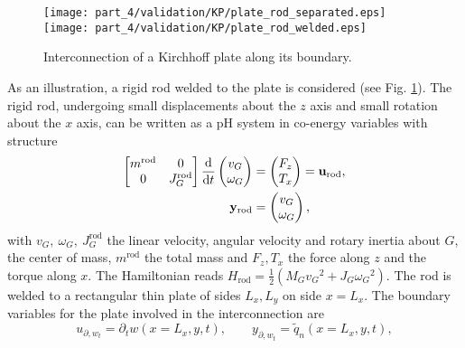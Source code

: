\begin{figure}[tb]
	\centering
	\texttt{[image: part\_4/validation/KP/plate\_rod\_separated.eps]} 
	\texttt{[image: part\_4/validation/KP/plate\_rod\_welded.eps]} 
	\caption{Interconnection of a Kirchhoff plate along its boundary.}
	\label{fig:sketchRodPlate}
\end{figure}

As an illustration, a rigid rod welded to the plate is considered  (see Fig. \ref{fig:sketchRodPlate}). The rigid rod, undergoing small displacements about the $z$ axis and small rotation about the $x$ axis, can be written as a pH system in co-energy variables with structure
\begin{equation}
\begin{aligned}
\begin{bmatrix}
m^{\mathrm{rod}} & 0 \\
0   & J_G^{\mathrm{rod}} \\
\end{bmatrix} 
\displaystyle \diff{}{t}
\begin{pmatrix}
v_G \\ \omega_G \\
\end{pmatrix} & = \begin{pmatrix}
F_z \\ T_x \\
\end{pmatrix} = \mathbf{u}_{\text{rod}}\vspace{1mm}, \\
\mathbf{y}_{\text{rod}} &= \begin{pmatrix}
v_G \\ \omega_{G} \\
\end{pmatrix},
\end{aligned}
\end{equation}
with $v_G, \ \omega_{G}, \ J_G^{\mathrm{rod}}$ the linear velocity, angular velocity and rotary inertia about $G$, the center of mass, $m^{\mathrm{rod}}$ the total mass  and $F_z, T_x$ the force along $z$ and the torque along $x$. The Hamiltonian reads $H_{\text{rod}}  = \frac{1}{2} \left(M_G {v_G}^2 + J_G {\omega_G}^2 \right)$. The rod is welded to a rectangular thin plate of sides $L_x, L_y$ on side $x = L_x$. The boundary variables for the plate involved in the interconnection are 
\begin{equation*}
u_{\partial, w_t} = \partial_t w(x = L_x, y, t),  \qquad  y_{\partial, w_t} = \widetilde{q}_n(x = L_x, y, t),
\end{equation*}
